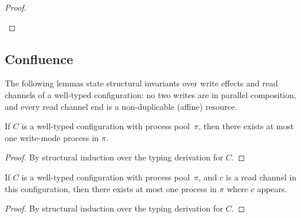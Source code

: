 \begin{theorem}[Preservation]
\begin{proof}
\begin{itemize}[leftmargin=*]
%
%
  \end{itemize}

\end{proof}
\end{theorem}


\subsection{Confluence}

The following lemmas state structural
invariants over write effects and read channels of a well-typed
configuration: no two writes are in parallel composition, and every read channel end is a non-duplicable (affine) resource.

\begin{lemma}
\label{lem:UniqueWriter}
If $C$ is a well-typed configuration with process pool~$\pi$, 
then there exists at most one write-mode process in $\pi$.
\begin{proof}
By structural induction over the typing derivation for $C$.
\end{proof}
\end{lemma}

\begin{lemma}
\label{lem:UniqueReader}
If $C$ is a well-typed configuration with process pool~$\pi$, 
and $c$ is a read channel in this configuration,
then there exists at most one process in $\pi$ where $c$ appears.
\begin{proof}
By structural induction over the typing derivation for $C$.
\end{proof}
\end{lemma}

